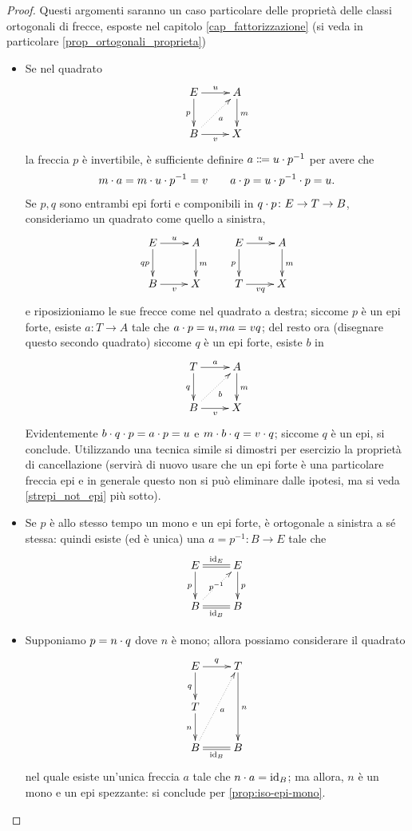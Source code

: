 \begin{proof}Questi argomenti saranno un caso particolare delle proprietà delle classi ortogonali di frecce, esposte nel capitolo \ref{cap_fattorizzazione} (si veda in particolare \ref{prop_ortogonali_proprieta})
 \begin{itemize}
  \item Se nel quadrato
        \[\xymatrix{
          E \ar[r]^u\ar[d]_p & A\ar[d]^m\\
          B \ar[r]_v \ar@{.>}[ur]_a & X
         }\]
        la freccia \(p\) è invertibile, è sufficiente definire \(a\defeq u\cmp p^{-1}\) per avere che
        \[m\cdot a=m\cdot u\cdot p^{-1}=v\qquad a\cdot p = u\cdot p^{-1}\cdot p=u.\]
        Se \(p,q\) sono entrambi epi forti e componibili in \(q\cdot p \colon E \to T\to B\), consideriamo un quadrato come quello a sinistra,
        \[\xymatrix{
          E \ar[r]^u\ar[d]_{qp} & A\ar[d]^m & E \ar[r]^u\ar[d]_p & A\ar[d]^m\\
          B \ar[r]_v  & X & T \ar[r]_{vq}  & X
         }\]
        e riposizioniamo le sue frecce come nel quadrato a destra; siccome \(p\) è un epi forte, esiste \(a \colon T \to A\) tale che \(a\cdot p=u,ma=vq\); del resto ora (disegnare questo secondo quadrato) siccome \(q\) è un epi forte, esiste \(b\) in
        \[\xymatrix{
          T \ar[r]^a\ar[d]_q & A\ar[d]^m\\
          B \ar[r]_v \ar@{.>}[ur]_b & X
         }\]
        Evidentemente \(b\cdot q\cdot p=a\cdot p=u\) e \(m\cdot b\cdot q=v\cdot q\); siccome \(q\) è un epi, si conclude. Utilizzando una tecnica simile si dimostri per esercizio la proprietà di cancellazione (servirà di nuovo usare che un epi forte è una particolare freccia epi e in generale questo non si può eliminare dalle ipotesi, ma si veda \ref{strepi_not_epi} più sotto).
  \item Se \(p\) è allo stesso tempo un mono e un epi forte, è ortogonale a sinistra a sé stessa: quindi esiste (ed è unica) una \(a = p^{-1}\colon B\to E\) tale che
        \[\xymatrix{
         E \ar@{=}[r]^-{\id_E}\ar[d]_p & E\ar[d]^p\\
         B \ar@{=}[r]_{\id_B} \ar@{.>}[ur]|{p^{-1}} & B
         }\]
  \item Supponiamo \(p = n\cdot q\) dove \(n\) è mono; allora possiamo considerare il quadrato
        \[\xymatrix{
          E \ar[r]^q\ar[d]_q & T\ar[dd]^n\\
          T \ar[d]_n & \\
          B \ar@{=}[r]_{\id_B} \ar@{.>}[uur]_a & B
         }\]
        nel quale esiste un'unica freccia \(a\) tale che \(n\cdot a=\mathrm{id}_B\); ma allora, \(n\) è un mono e un epi spezzante: si conclude per \ref{prop:iso-epi-mono}.\qedhere
 \end{itemize}
\end{proof}
